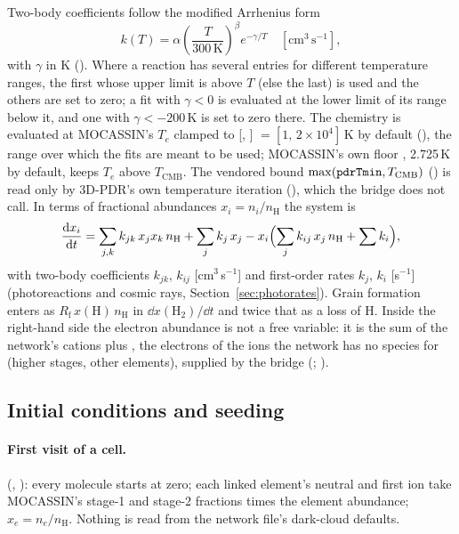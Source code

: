 Two-body coefficients follow the modified Arrhenius form
\begin{equation}
  k(T) = \alpha\left(\frac{T}{300\,\mathrm K}\right)^{\beta} e^{-\gamma/T}\quad[\mathrm{cm^3\,s^{-1}}],
  \label{eq:arrhenius}
\end{equation}
with $\gamma$ in K (). Where a reaction
has several entries for different temperature ranges, the first whose upper
limit is above $T$ (else the last) is used and the others are set to zero; a
fit with $\gamma<0$ is evaluated at the lower limit of its range below it, and one
with $\gamma<-200$\,K is set to zero there. The chemistry is evaluated at
MOCASSIN's $T_e$ clamped to [, ] $=[1,\,2\times10^4]$\,K by
default (), the range over which the fits are meant to be
used; MOCASSIN's own floor , 2.725\,K by default, keeps $T_e$ above
$T_{\mathrm{CMB}}$. The vendored bound $\max(\kw{pdrTmin},T_{\mathrm{CMB}})$
() is read only by 3D-PDR's own temperature iteration
(), which the bridge does not call. In terms of fractional abundances $x_i=n_i/n_{\mathrm H}$ the system is
\begin{equation}
  \frac{\mathrm{d} x_i}{\mathrm{d} t} = \sum_{j,k} k_{jk}\,x_jx_k\,n_{\mathrm H}
      + \sum_j k_j\,x_j - x_i\Bigl(\sum_j k_{ij}\,x_j\,n_{\mathrm H} + \sum k_i\Bigr),
  \label{eq:odes}
\end{equation}
with two-body coefficients $k_{jk}$, $k_{ij}$ [cm$^3$\,s$^{-1}$] and first-order rates
$k_j$, $k_i$ [s$^{-1}$] (photoreactions and cosmic rays, Section~\ref{sec:photorates}).
Grain formation enters as $R_{\mathrm f}\,x(\mathrm H)\,n_{\mathrm H}$ in $\dd x(\mathrm{H_2})/\dd t$
and twice that as a loss of H. Inside the right-hand side the electron
abundance is not a free variable: it is the sum of the network's cations plus
, the electrons of the ions the network has no species for
(higher stages, other elements), supplied by the bridge (;
).

\subsection{Initial conditions and seeding}
\label{sec:seed}

\paragraph{First visit of a cell.} 
(, ): every molecule starts at zero;
each linked element's neutral and first ion take MOCASSIN's stage-1 and stage-2
fractions times the element abundance; $x_e=n_e/n_{\mathrm H}$. Nothing is read
from the network file's dark-cloud defaults.

